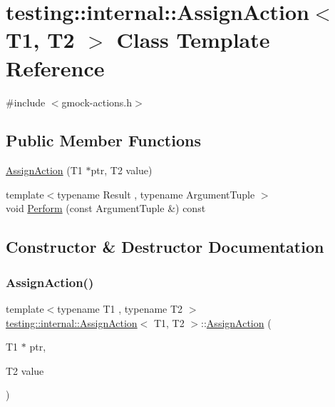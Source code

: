 \hypertarget{classtesting_1_1internal_1_1AssignAction}{}\section{testing\+::internal\+::Assign\+Action$<$ T1, T2 $>$ Class Template Reference}
\label{classtesting_1_1internal_1_1AssignAction}


{\ttfamily \#include $<$gmock-\/actions.\+h$>$}

\subsection*{Public Member Functions}
\begin{DoxyCompactItemize}
\item 
\mbox{\hyperlink{classtesting_1_1internal_1_1AssignAction_ae5a8fe8954ff3f8b26a08b57c3afdf9a}{Assign\+Action}} (T1 $\ast$ptr, T2 value)
\item 
{\footnotesize template$<$typename Result , typename Argument\+Tuple $>$ }\\void \mbox{\hyperlink{classtesting_1_1internal_1_1AssignAction_a540912bec1f4de6fc4c7de26312e4586}{Perform}} (const Argument\+Tuple \&) const
\end{DoxyCompactItemize}


\subsection{Constructor \& Destructor Documentation}
\mbox{\label{classtesting_1_1internal_1_1AssignAction_ae5a8fe8954ff3f8b26a08b57c3afdf9a}} 
\subsubsection{\texorpdfstring{AssignAction()}{AssignAction()}}
{\footnotesize\ttfamily template$<$typename T1 , typename T2 $>$ \\
\mbox{\hyperlink{classtesting_1_1internal_1_1AssignAction}{testing\+::internal\+::\+Assign\+Action}}$<$ T1, T2 $>$\+::\mbox{\hyperlink{classtesting_1_1internal_1_1AssignAction}{Assign\+Action}} (\begin{DoxyParamCaption}\item[{T1 $\ast$}]{ptr,  }\item[{T2}]{value }\end{DoxyParamCaption})\hspace{0.3cm}{\ttfamily [inline]}}



